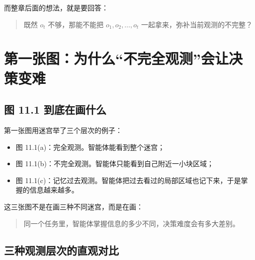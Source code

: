 \documentclass[12pt,a4paper]{ctexart}
\begin{document}
而整章后面的想法，就是要回答：
\begin{quote}
既然 \(o_t\) 不够，那能不能把 \(o_1,o_2,\ldots,o_t\) 一起拿来，弥补当前观测的不完整？
\end{quote}

\section{第一张图：为什么“不完全观测”会让决策变难}

\subsection{图 11.1 到底在画什么}

第一张图用迷宫举了三个层次的例子：
\begin{itemize}
  \item 图 11.1(a)：完全观测。智能体能看到整个迷宫；
  \item 图 11.1(b)：不完全观测。智能体只能看到自己附近一小块区域；
  \item 图 11.1(c)：记忆过去观测。智能体把过去看过的局部区域也记下来，于是掌握的信息越来越多。
\end{itemize}

这三张图不是在画三种不同迷宫，而是在画：
\begin{quote}
同一个任务里，智能体掌握信息的多少不同，决策难度会有多大差别。
\end{quote}



\subsection{三种观测层次的直观对比}
\end{document}
